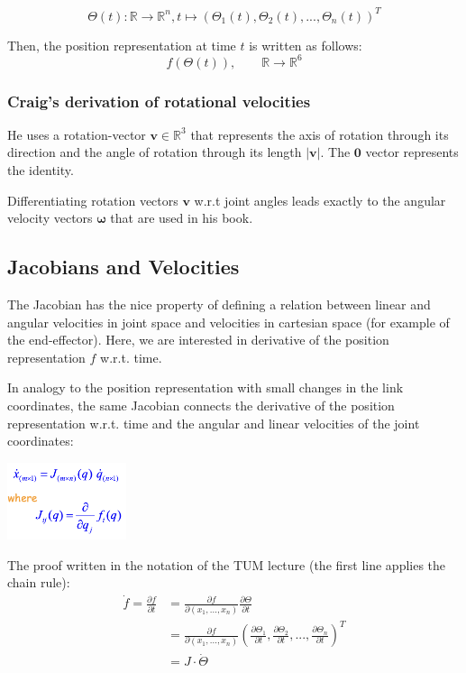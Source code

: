 \[ \Theta (t): \mathbb{R} \rightarrow \mathbb{R}^{n}, t \mapsto (\Theta_{1} (t)  , \Theta_{2} (t)  , ..., \Theta_{n} (t))^T  \]

Then, the position representation at time $ t $ is written as follows:
\[ f (\Theta (t)), \qquad \mathbb{R} \rightarrow \mathbb{R}^{6}\]

\subsubsection{Craig's derivation of rotational velocities}
He uses a rotation-vector $ \boldsymbol{v} \in \mathbb{R}^{3} $ that represents the axis of rotation through its direction and the angle of rotation through its length $ \left| \boldsymbol{v} \right| $. The $\boldsymbol{0}$ vector represents the identity.

Differentiating rotation vectors $ \boldsymbol{v} $ w.r.t joint angles leads exactly to the angular velocity vectors $ \boldsymbol{\omega} $ that are used in his book.
 
\subsection{Jacobians and Velocities}
The Jacobian has the nice property of defining a relation between linear and angular velocities in joint space and velocities in cartesian space (for example of the end-effector). Here, we are interested in derivative of the position representation $ f $ w.r.t. time. 

In analogy to the position representation with small changes in the link coordinates, the same Jacobian connects the derivative of the position representation w.r.t. time and the angular and linear velocities of the joint coordinates:

\begin{center}
	\includegraphics[width=3.5cm]{sections/imgs/4_velocity_derivative.png}\\
\end{center}

The proof written in the notation of the TUM lecture (the first line applies the chain rule):
\begin{align*}
	 \dot{f} = \frac{\partial f}{\partial t} &= \frac{\partial f}{\partial (x_1 , ..., x_{n})} \frac{\partial \Theta}{\partial t} \\
								   &= \frac{\partial f}{\partial (x_1 , ..., x_{n})} \left( \frac{\partial \Theta_1}{\partial t} , \frac{\partial \Theta_{2} }{\partial t},..., \frac{\partial \Theta_{n}}{\partial t} \right)^T \\
								   &= J \cdot \dot{\Theta}
\end{align*}


